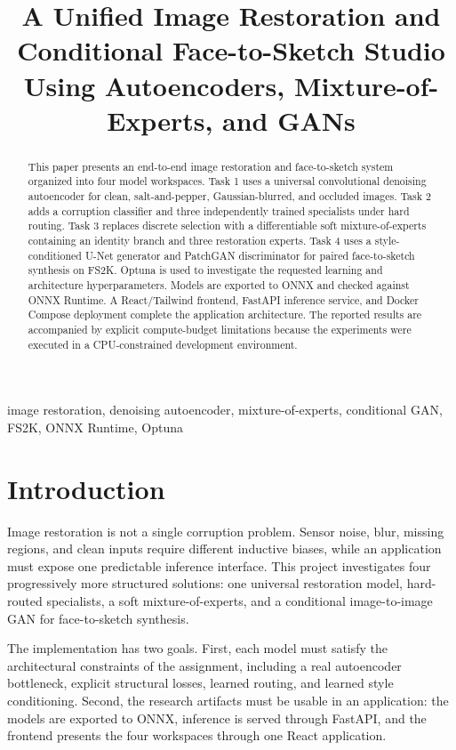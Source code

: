 \documentclass[conference]{IEEEtran}
\title{A Unified Image Restoration and Conditional Face-to-Sketch Studio Using Autoencoders, Mixture-of-Experts, and GANs}
\author{\IEEEauthorblockN{Assignment Implementation Report}
\IEEEauthorblockA{Generative AI Systems\\
2026}}
\begin{document}
\maketitle

\begin{abstract}
This paper presents an end-to-end image restoration and face-to-sketch system organized into four model workspaces. Task 1 uses a universal convolutional denoising autoencoder for clean, salt-and-pepper, Gaussian-blurred, and occluded images. Task 2 adds a corruption classifier and three independently trained specialists under hard routing. Task 3 replaces discrete selection with a differentiable soft mixture-of-experts containing an identity branch and three restoration experts. Task 4 uses a style-conditioned U-Net generator and PatchGAN discriminator for paired face-to-sketch synthesis on FS2K. Optuna is used to investigate the requested learning and architecture hyperparameters. Models are exported to ONNX and checked against ONNX Runtime. A React/Tailwind frontend, FastAPI inference service, and Docker Compose deployment complete the application architecture. The reported results are accompanied by explicit compute-budget limitations because the experiments were executed in a CPU-constrained development environment.
\end{abstract}

\begin{IEEEkeywords}
image restoration, denoising autoencoder, mixture-of-experts, conditional GAN, FS2K, ONNX Runtime, Optuna
\end{IEEEkeywords}

\section{Introduction}
Image restoration is not a single corruption problem. Sensor noise, blur, missing regions, and clean inputs require different inductive biases, while an application must expose one predictable inference interface. This project investigates four progressively more structured solutions: one universal restoration model, hard-routed specialists, a soft mixture-of-experts, and a conditional image-to-image GAN for face-to-sketch synthesis.

The implementation has two goals. First, each model must satisfy the architectural constraints of the assignment, including a real autoencoder bottleneck, explicit structural losses, learned routing, and learned style conditioning. Second, the research artifacts must be usable in an application: the models are exported to ONNX, inference is served through FastAPI, and the frontend presents the four workspaces through one React application.
\end{document}
